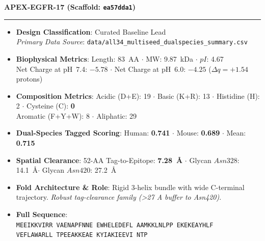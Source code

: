 \documentclass[11pt]{article}
\begin{document}
\noindent\textbf{\color{navyblue}\large APEX-EGFR-17  \quad (Scaffold: \texttt{ea57dda1})} \\
\vspace{-0.4em}
\rule{\textwidth}{0.6pt}
\vspace{-0.2em}
\begin{itemize}
  \setlength{\itemsep}{2pt}
  \setlength{\parskip}{0pt}
  \item \textbf{Design Classification}: Curated Baseline Lead \\
    \textit{Primary Data Source}: \texttt{\small data/all34\_multiseed\_dualspecies\_summary.csv}
  \item \textbf{Biophysical Metrics}: Length: 83~AA $\cdot$ MW: 9.87~kDa $\cdot$ $pI$: 4.67 \\
    Net Charge at pH~7.4: $-5.78$ $\cdot$ Net Charge at pH~6.0: $-4.25$ ($\Delta q = +1.54$ protons)
  \item \textbf{Composition Metrics}: Acidic (D+E): 19 $\cdot$ Basic (K+R): 13 $\cdot$ Histidine (H): 2 $\cdot$ Cysteine (C): \textbf{0} \\
    Aromatic (F+Y+W): 8 $\cdot$ Aliphatic: 29
  \item \textbf{Dual-Species Tagged Scoring}: Human: \textbf{0.741} $\cdot$ Mouse: \textbf{0.689} $\cdot$ Mean: \textbf{0.715}
  \item \textbf{Spatial Clearance}: 52-AA Tag-to-Epitope: \textbf{7.28~\AA} $\cdot$ Glycan $Asn328$: 14.1~\AA $\cdot$ Glycan $Asn420$: 27.2~\AA
  \item \textbf{Fold Architecture \& Role}: Rigid 3-helix bundle with wide C-terminal trajectory. \textit{Robust tag-clearance family (>27 A buffer to Asn420)}.
  \item \textbf{Full Sequence}: \\
    \texttt{\small MEEIKKVIRR VAENAPFNNE EWHELEDEFL AAMKKLNLPP EKEKEAYHLF \\
    VEFLAWARLL TPEEAKKEAE KYIAKIEEVI NTP}
\end{itemize}
\vspace{0.8em}
\end{document}
